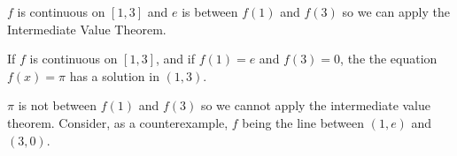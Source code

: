 \documentclass{ximera}
\begin{document}
\begin{exercise}
\begin{exercise}
\begin{exercise}
\begin{exercise}
\begin{multipleChoice}
\end{multipleChoice}

\begin{feedback}
$f$ is continuous on $\left[1,3\right]$ and $e$ is between $f(1)$ and $f(3)$ so we can apply the Intermediate Value Theorem.
\end{feedback}

\begin{exercise}

If $f$ is continuous on $\left[1,3\right]$, and if $f(1) = e$ and $f(3) = 0$, the the equation $f(x) = \pi$ has a solution in $\left(1,3\right)$.

\begin{multipleChoice}
\end{multipleChoice}

\begin{feedback}
$\pi$ is not between $f(1)$ and $f(3)$ so we cannot apply the intermediate value theorem.  Consider, as a counterexample, $f$ being the line between $(1,e)$ and $(3,0)$.
\end{feedback}

\end{exercise}
\end{exercise}
\end{exercise}
\end{exercise}
\end{exercise}
\end{document}
